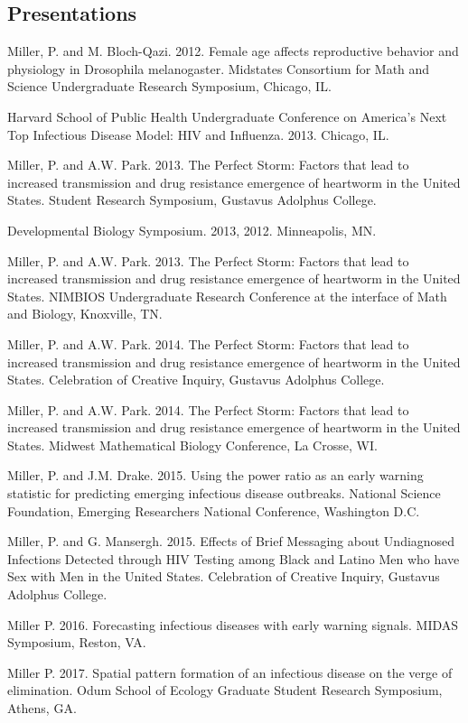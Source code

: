 \documentclass[letterpaper]{article}
\renewenvironment{itemize}{
  \begin{list}{}{
    \setlength{\leftmargin}{1.5em}
  }
}{
  \end{list}
}
\begin{document}
\subsection*{Presentations}
\begin{itemize}
\item Miller, P. and M. Bloch-Qazi. 2012. Female age affects reproductive behavior and physiology in Drosophila melanogaster. Midstates Consortium for Math and Science Undergraduate Research Symposium, Chicago, IL.
\item Harvard School of Public Health Undergraduate Conference on America’s Next Top Infectious Disease Model: HIV and Influenza. 2013. Chicago, IL.
\item Miller, P. and A.W. Park. 2013. The Perfect Storm: Factors that lead to increased transmission and drug resistance emergence of heartworm in the United States. Student Research Symposium, Gustavus Adolphus College.
\item Developmental Biology Symposium. 2013, 2012. Minneapolis, MN.
\item Miller, P. and A.W. Park. 2013. The Perfect Storm: Factors that lead to increased transmission and drug resistance emergence of heartworm in the United States. NIMBIOS Undergraduate Research Conference at the interface of Math and Biology, Knoxville, TN.
\item Miller, P. and A.W. Park. 2014. The Perfect Storm: Factors that lead to increased transmission and drug resistance emergence of heartworm in the United States. Celebration of Creative Inquiry, Gustavus Adolphus College.
\item Miller, P. and A.W. Park. 2014. The Perfect Storm: Factors that lead to increased transmission and drug resistance emergence of heartworm in the United States. Midwest Mathematical Biology Conference, La Crosse, WI.
\item Miller, P. and J.M. Drake. 2015. Using the power ratio as an early warning statistic for predicting emerging infectious disease outbreaks. National Science Foundation, Emerging Researchers National Conference, Washington D.C.
\item Miller, P. and G. Mansergh. 2015. Effects of Brief Messaging about Undiagnosed Infections Detected through HIV Testing among Black and Latino Men who have Sex with Men in the United States. Celebration of Creative Inquiry, Gustavus Adolphus College.
\item Miller P. 2016. Forecasting infectious diseases with early warning signals. MIDAS Symposium, Reston, VA. 
\item Miller P. 2017. Spatial pattern formation of an infectious disease on the verge of elimination. Odum School of Ecology Graduate Student Research Symposium, Athens, GA. 
\end{itemize}
\end{document}

